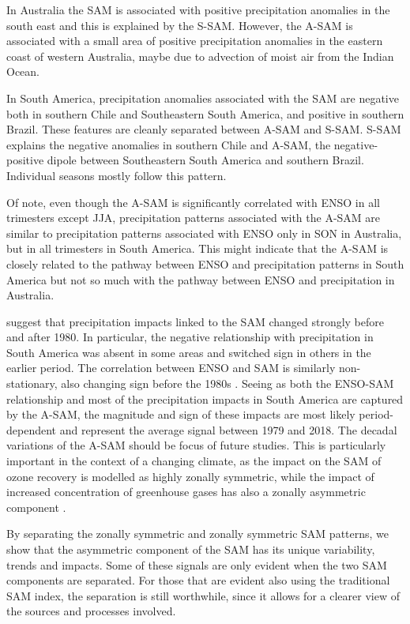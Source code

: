 \documentclass[smallextended]{svjour3}       %
\begin{document}
In Australia the SAM is associated with positive precipitation anomalies in the south east and this is explained by the S\nobreakdash-SAM.
However, the A\nobreakdash-SAM is associated with a small area of positive precipitation anomalies in the eastern coast of western Australia, maybe due to advection of moist air from the Indian Ocean.

In South America, precipitation anomalies associated with the SAM are negative both in southern Chile and Southeastern South America, and positive in southern Brazil.
These features are cleanly separated between A\nobreakdash-SAM and S\nobreakdash-SAM.
S\nobreakdash-SAM explains the negative anomalies in southern Chile and A\nobreakdash-SAM, the negative-positive dipole between Southeastern South America and southern Brazil.
Individual seasons mostly follow this pattern.

Of note, even though the A\nobreakdash-SAM is significantly correlated with ENSO in all trimesters except JJA, precipitation patterns associated with the A\nobreakdash-SAM are similar to precipitation patterns associated with ENSO only in SON in Australia, but in all trimesters in South America.
This might indicate that the A\nobreakdash-SAM is closely related to the pathway between ENSO and precipitation patterns in South America but not so much with the pathway between ENSO and precipitation in Australia.

\citet{silvestri2009} suggest that precipitation impacts linked to the SAM changed strongly before and after 1980.
In particular, the negative relationship with precipitation in South America was absent in some areas and switched sign in others in the earlier period.
The correlation between ENSO and SAM is similarly non-stationary, also changing sign before the 1980s \citep{fogt2006, clem2013}.
Seeing as both the ENSO\nobreakdash-SAM relationship and most of the precipitation impacts in South America are captured by the A\nobreakdash-SAM, the magnitude and sign of these impacts are most likely period-dependent and represent the average signal between 1979 and 2018.
The decadal variations of the A\nobreakdash-SAM should be focus of future studies.
This is particularly important in the context of a changing climate, as the impact on the SAM of ozone recovery is modelled as highly zonally symmetric, while the impact of increased concentration of greenhouse gases has also a zonally asymmetric component \citep{arblaster2006}.

By separating the zonally symmetric and zonally symmetric SAM patterns, we show that the asymmetric component of the SAM has its unique variability, trends and impacts.
Some of these signals are only evident when the two SAM components are separated.
For those that are evident also using the traditional SAM index, the separation is still worthwhile, since it allows for a clearer view of the sources and processes involved.
\end{document}
